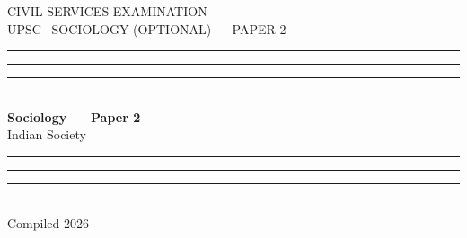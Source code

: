 \documentclass[11pt,a4paper,twoside,openright]{book}
\newcommand{\BookExamEyebrow}{CIVIL SERVICES EXAMINATION}
\newcommand{\BookExamLine}{UPSC \textbullet\ SOCIOLOGY (OPTIONAL) --- PAPER 2}
\newcommand{\BookTitle}{Sociology --- Paper 2}
\newcommand{\BookSubtitle}{Indian Society}
\newcommand{\BookDate}{2026}
\begin{document}

\begin{titlepage}
\begin{center}
\vspace*{2.2cm}
{\color{Grey}\sffamily\fontsize{9.5}{12}\selectfont\MakeUppercase{\BookExamEyebrow}}\\[12pt]
{\color{Ink}\sffamily\fontsize{10.5}{13}\selectfont \BookExamLine}\\[40pt]
\textcolor{AccentWarm}{\rule{0.08\textwidth}{2pt}}\hspace{6pt}%
\textcolor{Accent}{\rule{0.05\textwidth}{2pt}}\hspace{6pt}%
\textcolor{Hairline}{\rule{0.03\textwidth}{2pt}}\\[28pt]
{\color{Accent}\sffamily\bfseries\fontsize{28}{34}\selectfont \BookTitle}\\[12pt]
{\color{Grey}\sffamily\fontsize{14}{18}\selectfont \BookSubtitle}\\[36pt]
\textcolor{Hairline}{\rule{0.03\textwidth}{2pt}}\hspace{6pt}%
\textcolor{Accent}{\rule{0.05\textwidth}{2pt}}\hspace{6pt}%
\textcolor{AccentWarm}{\rule{0.08\textwidth}{2pt}}\\[28pt]
{\sffamily\fontsize{9.5}{12}\selectfont\color{Grey} Compiled \BookDate}
\vfill
\vspace*{1.8cm}
\end{center}
\end{titlepage}

\clearpage
{}
\setcounter{page}{1}
\tableofcontents\label{toc}
\thispagestyle{plain}
\clearpage
\end{document}
